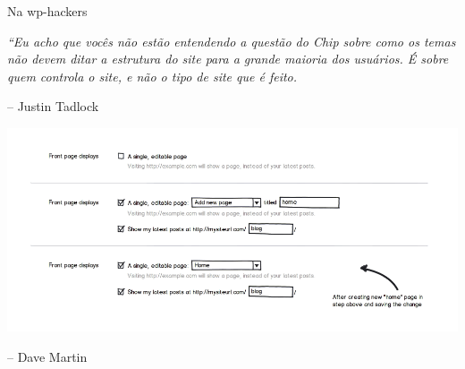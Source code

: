 \documentclass[handout]{beamer}
\begin{document}
\begin{frame}{Na wp-hackers}
\begin{center}
  \emph{``Eu acho que vocês não estão entendendo a questão do Chip sobre como
  os temas não devem ditar a estrutura do site para a grande maioria dos
  usuários. É sobre quem controla o site, e não o tipo de site que é feito.}
\end{center}

-- Justin Tadlock

\end{frame}

\begin{frame}
\begin{center}
  \includegraphics[width=\textwidth]{./img/proposal-dave-martin.png}
\end{center}

-- Dave Martin

\end{frame}
\end{document}
